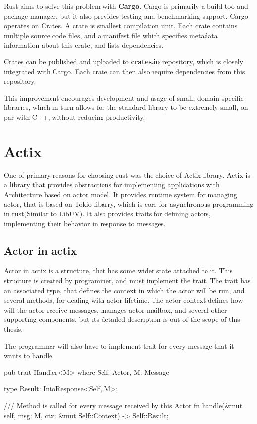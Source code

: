 Rust aims to solve this problem with \textbf{Cargo}. Cargo is primarily a build too and package manager, but it also
provides testing and benchmarking support. Cargo operates on Crates. A crate is smallest compilation unit.
Each crate contains multiple source code files, and a manifest file which specifies metadata information about this crate, and lists dependencies.

Crates can be published and uploaded to \textbf{crates.io} repository, which is closely integrated with Cargo. Each crate can then
also require dependencies from this repository.

This improvement encourages development and usage of small, domain specific libraries, which in
turn allows for the standard library to be extremely small, on par with C++, without reducing productivity.

\section{Actix}
One of primary reasons for choosing rust was the choice of Actix\cite{web:actix} library. Actix is a library that provides abstractions
for implementing applications with Architecture based on actor model. It provides runtime system for managing actor, that is
based on Tokio libarry, which is core for asynchronous programming in rust(Similar to LibUV). It also provides
traits for defining actors, implementing their behavior in response to messages.

\subsection{Actor in actix}
Actor in actix is a structure, that has some wider state attached to it. This structure is created by programmer, and must
implement the  trait. The  trait has an associated type, that defines the context in which the actor will be run,
and several methods, for dealing with actor lifetime.
The actor context defines how will the actor receive messages, manages actor mailbox, and several other
supporting components, but its detailed description is out of the scope of this thesis.

The programmer will also have to implement  trait for every message that it wants to handle.

\begin{code}[language=rust,label={handler_trait},caption={Handler trait}]
    pub trait Handler<M> where Self: Actor, M: Message
    {
        type Result: IntoResponse<Self, M>;

        /// Method is called for every message received by this Actor
        fn handle(&mut self, msg: M, ctx: &mut Self::Context) -> Self::Result;

    }
\end{code}

